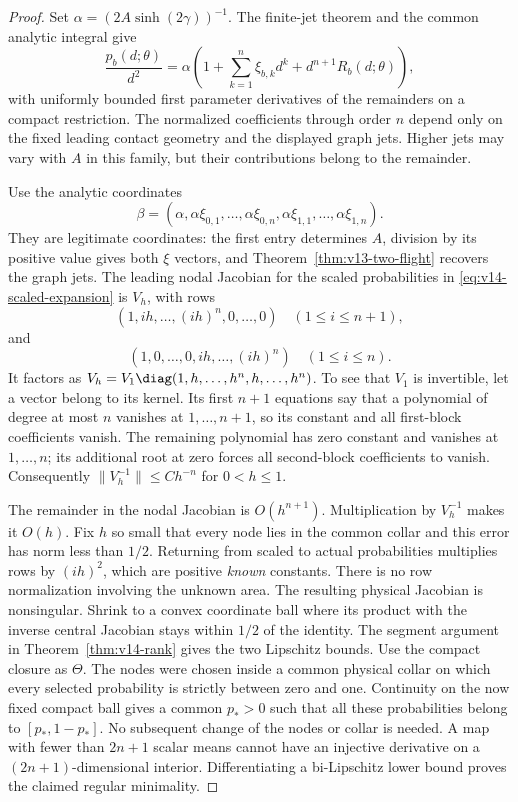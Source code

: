 \begin{proof}
Set $\alpha=(2A\sinh(2\gamma))^{-1}$. The finite-jet theorem and
the common analytic integral give
\begin{equation}\label{eq:v14-scaled-expansion}
 \frac{p_b(d;\theta)}{d^2}
 =\alpha\left(1+\sum_{k=1}^n\xi_{b,k}d^k
                            +d^{n+1}R_b(d;\theta)\right),
\end{equation}
with uniformly bounded first parameter derivatives of the remainders
on a compact restriction. The normalized coefficients through order
$n$ depend only on the fixed leading contact geometry and the displayed
graph jets. Higher jets may vary with $A$ in this family, but their
contributions belong to the remainder.

Use the analytic coordinates
\[
 \beta=(\alpha,\alpha\xi_{0,1},\ldots,\alpha\xi_{0,n},
                  \alpha\xi_{1,1},\ldots,\alpha\xi_{1,n}).
\]
They are legitimate coordinates: the first entry determines $A$,
division by its positive value gives both $\xi$ vectors, and
Theorem~\ref{thm:v13-two-flight} recovers the graph jets.
The leading nodal Jacobian for the scaled probabilities in
\eqref{eq:v14-scaled-expansion} is $V_h$, with rows
\[
 (1,ih,\ldots,(ih)^n,0,\ldots,0)\quad(1\le i\le n+1),
\]
and
\[
 (1,0,\ldots,0,ih,\ldots,(ih)^n)\quad(1\le i\le n).
\]
It factors as
$V_h=V_1\diag(1,h,\ldots,h^n,h,\ldots,h^n)$.
To see that $V_1$ is invertible, let a vector belong to its kernel.
Its first $n+1$ equations say that a polynomial of degree at most
$n$ vanishes at $1,\ldots,n+1$, so its constant and all first-block
coefficients vanish. The remaining polynomial has zero constant and
vanishes at $1,\ldots,n$; its additional root at zero forces all
second-block coefficients to vanish. Consequently
$\|V_h^{-1}\|\le C h^{-n}$ for $0<h\le1$.

The remainder in the nodal Jacobian is $O(h^{n+1})$. Multiplication
by $V_h^{-1}$ makes it $O(h)$. Fix $h$ so small that every node lies
in the common collar and this error has norm less than $1/2$.
Returning from scaled to actual probabilities multiplies rows by
$(ih)^2$, which are positive \emph{known} constants. There is no row
normalization involving the unknown area. The resulting physical
Jacobian is nonsingular. Shrink to a convex coordinate ball where
its product with the inverse central Jacobian stays within $1/2$ of
the identity. The segment argument in Theorem~\ref{thm:v14-rank}
gives the two Lipschitz bounds. Use the compact closure as $\Theta$.
The nodes were chosen inside a common physical collar on which every
selected probability is strictly between zero and one. Continuity on
the now fixed compact ball gives a common $p_*>0$ such that all these
probabilities belong to $[p_*,1-p_*]$. No subsequent change of the
nodes or collar is needed. A map with fewer than $2n+1$ scalar means cannot have an
injective derivative on a $(2n+1)$-dimensional interior. Differentiating
a bi-Lipschitz lower bound proves the claimed regular minimality.


\end{proof}
